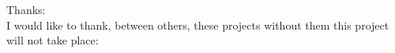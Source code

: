 %
%
%

\newpage

{\huge Thanks:}\\

I would like to thank, between others, these projects without them this project will not take place:

